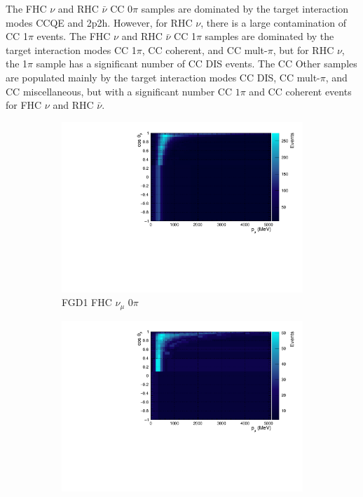 The FHC $\nu$ and RHC $\bar{\nu}$ CC 0$\pi$ samples are dominated by the target interaction modes CCQE and 2p2h. However, for RHC $\nu$, there is a large contamination of CC 1$\pi$ events. The FHC $\nu$ and RHC $\bar{\nu}$ CC 1$\pi$ samples are dominated by the target interaction modes CC 1$\pi$, CC coherent, and CC mult-$\pi$, but for RHC $\nu$, the 1$\pi$ sample has a significant number of CC DIS events. The CC Other samples are populated mainly by the target interaction modes CC DIS, CC mult-$\pi$, and CC miscellaneous, but with a significant number CC $1\pi$ and CC coherent events for FHC $\nu$ and RHC $\bar{\nu}$.

\begin{figure}[!htbp]
\centering
\begin{subfigure}{.32\textwidth}
  \centering
  \includegraphics[width=0.95\linewidth]{figs/TH2PolyNom_MC_FGD1_numuCC_0pi}
  \caption{FGD1 FHC $\nu_{\mu}$ 0$\pi$}
  \label{fig:th2polynomFGD1_numuCC_0pi}
\end{subfigure}
\begin{subfigure}{.32\textwidth}
  \centering
  \includegraphics[width=0.95\linewidth]{figs/TH2PolyNom_MC_FGD1_numuCC_1pi}

\end{subfigure}
\end{figure}
